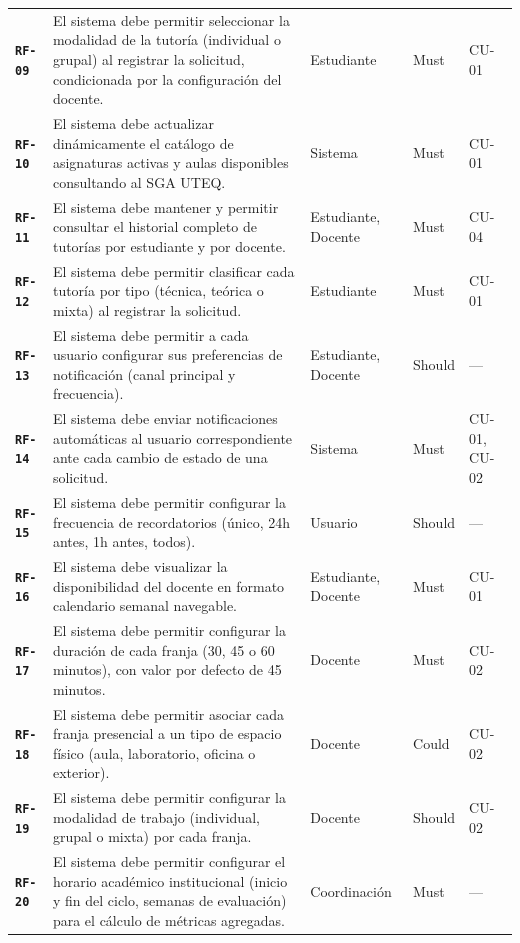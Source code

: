 \documentclass[11pt,a4paper,twoside]{report}
\newcommand{\reqid}[1]{\texttt{\textbf{#1}}}
\begin{document}
\begin{longtable}{@{}p{1.2cm}p{7.5cm}p{2.5cm}p{1.3cm}p{1.5cm}@{}}
    \reqid{RF-09}\label{rf:09} & El sistema debe permitir seleccionar la modalidad de la tutor\'ia (individual o grupal) al registrar la solicitud, condicionada por la configuraci\'on del docente. & Estudiante & Must & CU-01 \\
    \reqid{RF-10}\label{rf:10} & El sistema debe actualizar din\'amicamente el cat\'alogo de asignaturas activas y aulas disponibles consultando al SGA UTEQ. & Sistema & Must & CU-01 \\
    \reqid{RF-11}\label{rf:11} & El sistema debe mantener y permitir consultar el historial completo de tutor\'ias por estudiante y por docente. & Estudiante, Docente & Must & CU-04 \\
    \reqid{RF-12}\label{rf:12} & El sistema debe permitir clasificar cada tutor\'ia por tipo (t\'ecnica, te\'orica o mixta) al registrar la solicitud. & Estudiante & Must & CU-01 \\
    \reqid{RF-13}\label{rf:13} & El sistema debe permitir a cada usuario configurar sus preferencias de notificaci\'on (canal principal y frecuencia). & Estudiante, Docente & Should & --- \\
    \reqid{RF-14}\label{rf:14} & El sistema debe enviar notificaciones autom\'aticas al usuario correspondiente ante cada cambio de estado de una solicitud. & Sistema & Must & CU-01, CU-02 \\
    \reqid{RF-15}\label{rf:15} & El sistema debe permitir configurar la frecuencia de recordatorios (\'unico, 24h antes, 1h antes, todos). & Usuario & Should & --- \\
    \reqid{RF-16}\label{rf:16} & El sistema debe visualizar la disponibilidad del docente en formato calendario semanal navegable. & Estudiante, Docente & Must & CU-01 \\
    \reqid{RF-17}\label{rf:17} & El sistema debe permitir configurar la duraci\'on de cada franja (30, 45 o 60 minutos), con valor por defecto de 45 minutos. & Docente & Must & CU-02 \\
    \reqid{RF-18}\label{rf:18} & El sistema debe permitir asociar cada franja presencial a un tipo de espacio f\'isico (aula, laboratorio, oficina o exterior). & Docente & Could & CU-02 \\
    \reqid{RF-19}\label{rf:19} & El sistema debe permitir configurar la modalidad de trabajo (individual, grupal o mixta) por cada franja. & Docente & Should & CU-02 \\
    \reqid{RF-20}\label{rf:20} & El sistema debe permitir configurar el horario acad\'emico institucional (inicio y fin del ciclo, semanas de evaluaci\'on) para el c\'alculo de m\'etricas agregadas. & Coordinaci\'on & Must & --- \\

\end{longtable}
\end{document}
